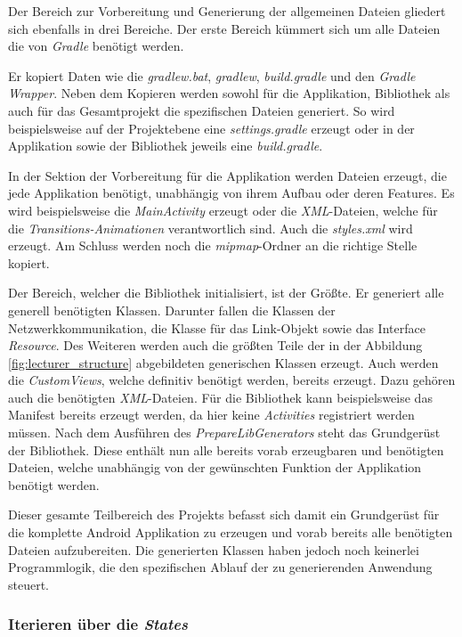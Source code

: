 Der Bereich zur Vorbereitung und Generierung der allgemeinen Dateien gliedert sich ebenfalls in drei Bereiche. Der erste Bereich kümmert sich um alle Dateien die von \textit{Gradle} benötigt werden. 

Er kopiert Daten wie die \textit{gradlew.bat}, \textit{gradlew}, \textit{build.gradle} und den \textit{Gradle Wrapper}. 
Neben dem Kopieren werden sowohl für die Applikation, Bibliothek als auch für das Gesamtprojekt die spezifischen Dateien generiert. So wird beispielsweise auf der Projektebene eine \textit{settings.gradle} erzeugt oder in der Applikation sowie der Bibliothek jeweils eine \textit{build.gradle}.

In der Sektion der Vorbereitung für die Applikation werden Dateien erzeugt, die jede Applikation benötigt, unabhängig von ihrem Aufbau oder deren Features. Es wird beispielsweise die \textit{MainActivity} erzeugt oder die \textit{XML}-Dateien, welche für die \textit{Transitions-Animationen} verantwortlich sind. Auch die \textit{styles.xml} wird erzeugt. Am Schluss werden noch die \textit{mipmap}-Ordner an die richtige Stelle kopiert.

Der Bereich, welcher die Bibliothek initialisiert, ist der Größte. Er generiert alle generell benötigten Klassen. Darunter fallen die Klassen der Netzwerkkommunikation, die Klasse für das Link-Objekt sowie das Interface \textit{Resource}. Des Weiteren werden auch die größten Teile der in der Abbildung \ref{fig:lecturer_structure} abgebildeten generischen Klassen erzeugt. Auch werden die \textit{CustomViews}, welche definitiv benötigt werden, bereits erzeugt. Dazu gehören auch die benötigten \textit{XML}-Dateien. Für die Bibliothek kann beispielsweise das Manifest bereits erzeugt werden, da hier keine \textit{Activities} registriert werden müssen. Nach dem Ausführen des \textit{PrepareLibGenerators} steht das Grundgerüst der Bibliothek. Diese enthält nun alle bereits vorab erzeugbaren und benötigten Dateien, welche unabhängig von der gewünschten Funktion der Applikation benötigt werden. 

Dieser gesamte Teilbereich des Projekts befasst sich damit ein Grundgerüst für die komplette Android Applikation zu erzeugen und vorab bereits alle benötigten Dateien aufzubereiten. Die generierten Klassen haben jedoch noch keinerlei Programmlogik, die den spezifischen Ablauf der zu generierenden Anwendung steuert.

\subsubsection{Iterieren über die \textit{States}}


